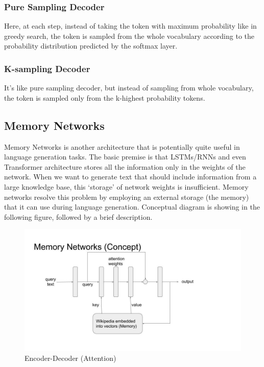\documentclass[]{krantz}
\begin{document}
\hypertarget{pure-sampling-decoder}{%
\subsubsection{Pure Sampling Decoder}\label{pure-sampling-decoder}}

Here, at each step, instead of taking the token with maximum probability like in greedy search, the token is sampled from the whole vocabulary according to the probability distribution predicted by the softmax layer.

\hypertarget{k-sampling-decoder}{%
\subsubsection{K-sampling Decoder}\label{k-sampling-decoder}}

It's like pure sampling decoder, but instead of sampling from whole vocabulary, the token is sampled only from the k-highest probability tokens.

\hypertarget{memory-networks}{%
\subsection{Memory Networks}\label{memory-networks}}

Memory Networks is another architecture that is potentially quite useful in language generation tasks. The basic premise is that LSTMs/RNNs and even Transformer architecture stores all the information only in the weights of the network. When we want to generate text that should include information from a large knowledge base, this `storage' of network weights is insufficient. Memory networks resolve this problem by employing an external storage (the memory) that it can use during language generation. Conceptual diagram is showing in the following figure, followed by a brief description.

\begin{figure}
\centering
\includegraphics{figures/04-01-use-case1/memory_networks.jpg}
\caption{Encoder-Decoder (Attention)}
\end{figure}
\end{document}
